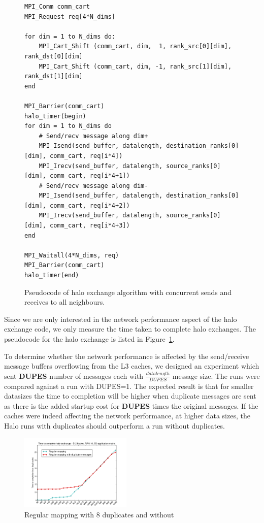 \documentclass{acm_proc_article-sp}
\begin{document}
\begin{figure}[ht]
  {\footnotesize
  \begin{lstlisting}[frame=lines, basicstyle=\ttfamily,columns=fixed]
MPI_Comm comm_cart
MPI_Request req[4*N_dims]

for dim = 1 to N_dims do:
    MPI_Cart_Shift (comm_cart, dim,  1, rank_src[0][dim], rank_dst[0][dim]
    MPI_Cart_Shift (comm_cart, dim, -1, rank_src[1][dim], rank_dst[1][dim]
end

MPI_Barrier(comm_cart)
halo_timer(begin)
for dim = 1 to N_dims do
    # Send/recv message along dim+
    MPI_Isend(send_buffer, datalength, destination_ranks[0][dim], comm_cart, req[i*4])
    MPI_Irecv(send_buffer, datalength, source_ranks[0][dim], comm_cart, req[i*4+1])
    # Send/recv message along dim-
    MPI_Isend(send_buffer, datalength, destination_ranks[0][dim], comm_cart, req[i*4+2])
    MPI_Irecv(send_buffer, datalength, source_ranks[0][dim], comm_cart, req[i*4+3])
end

MPI_Waitall(4*N_dims, req)
MPI_Barrier(comm_cart)
halo_timer(end)
  \end{lstlisting}
  }
  \caption{Pseudocode of halo exchange algorithm with concurrent sends and
           receives to all neighbours.}
    \label{fig:halo_pseudocode}
\end{figure}

Since we are only interested in the network performance aspect of the halo exchange code, we only measure
the time taken to complete halo exchanges. The pseudocode for the halo exchange is listed in Figure~\ref{fig:halo_pseudocode}.


To determine whether the network performance is affected by the send/receive message buffers overflowing from the
L3 caches, we designed an experiment which sent \textbf{DUPES} number of messages each with $\frac{datalength}{DUPES}$
message size. The runs were compared against a run with DUPES=1. The expected result is that for smaller datasizes
the time to completion will be higher when duplicate messages are sent as there is the added startup cost for \textbf{DUPES} times the original messages.
If the caches were indeed affecting the network performance, at higher data sizes, the Halo runs with duplicates should outperform
a run without duplicates.

\begin{figure}
  \center
  \includegraphics[width=0.475\textwidth]{regular_vs_cache_duplicates.png}
  \caption{Regular mapping with 8 duplicates and without}
    \label{fig:caching_figure_vs_without}
\end{figure}
\end{document}
